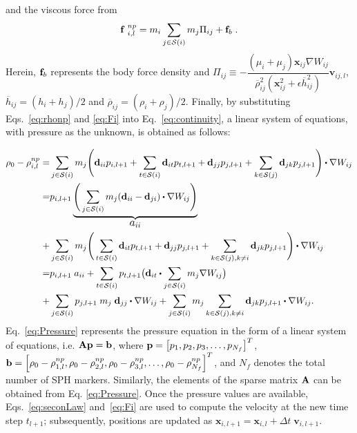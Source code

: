 and the viscous force from \cite{armanCompFluids2015}
\begin{equation}\label{eq:viscosity}
{\bf f}\;^{np}_{i,l}= m_i \sum_{j \in {\cal S}(i)} m_j \Pi _{ij}+{\bf f}_b\; .
\end{equation}
Herein, ${\bf f}_b$ represents the body force density and  $\Pi _{ij} \equiv -\dfrac{(\mu_i+\mu_j)\mathbf x_{ij}\nabla W_{ij} }{\overline{\rho}^2_{ij}(\mathbf x^2_{ij}+\epsilon \overline{h}^2_{ij})}\mathbf v_{ij,l}$,  $ \overline{h}_{ij}= (h_i+ h_j)/2$ and $ \overline{\rho}_{ij}= (\rho_i+ \rho_j)/2$.  Finally, by substituting Eqs.~\ref{eq:rhonp} and \ref{eq:Fi} into Eq.~\ref{eq:continuity}, a linear system of equations, with pressure as the unknown, is obtained as follows:

\begin{equation}\label{eq:Pressure}
\begin{split}
\rho _0- \rho_{i,l}^{np}= & \sum_{j \in {\cal S}(i)} m_j \Bigg( \mathbf{d}_{ii} p_{i,l+1}+\sum_{t \in {\cal S}(i)} \mathbf{d}_{it} p_{t,l+1} + \mathbf{d}_{jj} p_{j,l+1}+\sum_{k \in {\cal S}(j)} \mathbf{d}_{jk} p_{j,l+1}\Bigg) \bigcdot \nabla W_{ij}\\
=&p_{i,l+1}\underbrace{ \Bigg(  \sum_{j \in {\cal S}(i)} m_j ( \mathbf{d}_{ii}-\mathbf{d}_{ji}) \bigcdot  \nabla W_{ij}\Bigg ) }_{\text{\large $a_{ii}$}} \\ +& \sum_{j \in {\cal S}(i)} m_j\Bigg( \sum_{t \in {\cal S}(i)} \mathbf{d}_{it} p_{t,l+1}  + \mathbf{d}_{jj} p_{j,l+1}+\sum_{k \in {\cal S}(j), k\neq i} \mathbf{d}_{jk} p_{j,l+1}\Bigg)\bigcdot  \nabla W_{ij}\\
=&p_{i,l+1} \; a_{ii} +  \sum_{t \in {\cal S}(i)} p_{t,l+1} \big(\mathbf{d}_{it} \bigcdot  \sum_{j \in {\cal S}(i)} m_j \nabla W_{ij}\big) \\ +& \sum_{j \in {\cal S}(i)} p_{j,l+1}  \; m_j \; \mathbf{d}_{jj}\bigcdot  \nabla W_{ij} + \sum_{j \in {\cal S}(i)} m_j  \sum_{k \in {\cal S}(j), k\neq i} \mathbf{d}_{jk} p_{j,l+1}\bigcdot  \nabla W_{ij}.
\end{split} 
\end{equation}
Eq.~\ref{eq:Pressure} represents the pressure equation in the form of a linear system of equations, i.e. $\mathbf{A} {\bf p}={\bf b}$, where ${\bf p} = \left[ p_1, p_2, p_3, \ldots, p_{N_f} \right]^T$, ${\bf b} = \left[ \rho_0-\rho_{1,l}^{np}, \rho_0-\rho_{2,l}^{np}, \rho_0-\rho_{3,l}^{np},\ldots, \rho_0-\rho_{N_f}^{np}\right]^T$, and $N_f$ denotes the total number of SPH markers.  Similarly, the elements of the sparse matrix $\mathbf{A}$ can be obtained from Eq. \ref{eq:Pressure}. 
%
Once the pressure values are available, Eqs.~\ref{eq:seconLaw} and~\ref{eq:Fi} are used to compute the velocity at the new time step $t_{l+1}$; subsequently, positions are updated as $\mathbf{x}_{i,l+1}=\mathbf{x}_{i,l}+ \Delta t \; \mathbf{v}_{i,l+1}$. 

